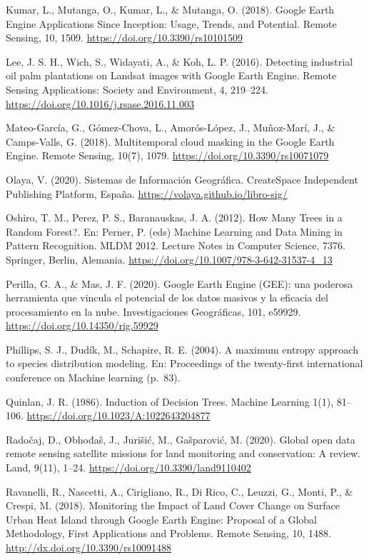 \documentclass[
  12pt,
  letterpaper,
  twoside]{book}
\begin{document}
Kumar, L., Mutanga, O., Kumar, L., \& Mutanga, O. (2018). Google Earth Engine Applications Since Inception: Usage, Trends, and Potential. Remote Sensing, 10, 1509. \url{https://doi.org/10.3390/rs10101509}

Lee, J. S. H., Wich, S., Widayati, A., \& Koh, L. P. (2016). Detecting industrial oil palm plantations on Landsat images with Google Earth Engine. Remote Sensing Applications: Society and Environment, 4, 219--224. \url{https://doi.org/10.1016/j.rsase.2016.11.003}

Mateo-García, G., Gómez-Chova, L., Amorós-López, J., Muñoz-Marí, J., \& Camps-Valls, G. (2018). Multitemporal cloud masking in the Google Earth Engine. Remote Sensing, 10(7), 1079. \url{https://doi.org/10.3390/rs10071079}

Olaya, V. (2020). Sistemas de Información Geográfica. CreateSpace Independent Publishing Platform, España. \url{https://volaya.github.io/libro-sig/}

Oshiro, T. M., Perez, P. S., Baranauskas, J. A. (2012). How Many Trees in a Random Forest?. En: Perner, P. (eds) Machine Learning and Data Mining in Pattern Recognition. MLDM 2012. Lecture Notes in Computer Science, 7376. Springer, Berlin, Alemania. \url{https://doi.org/10.1007/978-3-642-31537-4_13}

Perilla, G. A., \& Mas, J. F. (2020). Google Earth Engine (GEE): una poderosa herramienta que vincula el potencial de los datos masivos y la eficacia del procesamiento en la nube. Investigaciones Geográficas, 101, e59929. \url{https://doi.org/10.14350/rig.59929}

Phillips, S. J., Dudík, M., Schapire, R. E. (2004). A maximum entropy approach to species distribution modeling. En: Proceedings of the twenty-first international conference on Machine learning (p.~83).

Quinlan, J. R. (1986). Induction of Decision Trees. Machine Learning 1(1), 81--106. \url{https://doi.org/10.1023/A:1022643204877}

Radočaj, D., Obhođaš, J., Jurišić, M., Gašparović, M. (2020). Global open data remote sensing satellite missions for land monitoring and conservation: A review. Land, 9(11), 1--24. \url{https://doi.org/10.3390/land9110402}

Ravanelli, R., Nascetti, A., Cirigliano, R., Di Rico, C., Leuzzi, G., Monti, P., \& Crespi, M. (2018). Monitoring the Impact of Land Cover Change on Surface Urban Heat Island through Google Earth Engine: Proposal of a Global Methodology, First Applications and Problems. Remote Sensing, 10, 1488. \url{http://dx.doi.org/10.3390/rs10091488}
\end{document}
